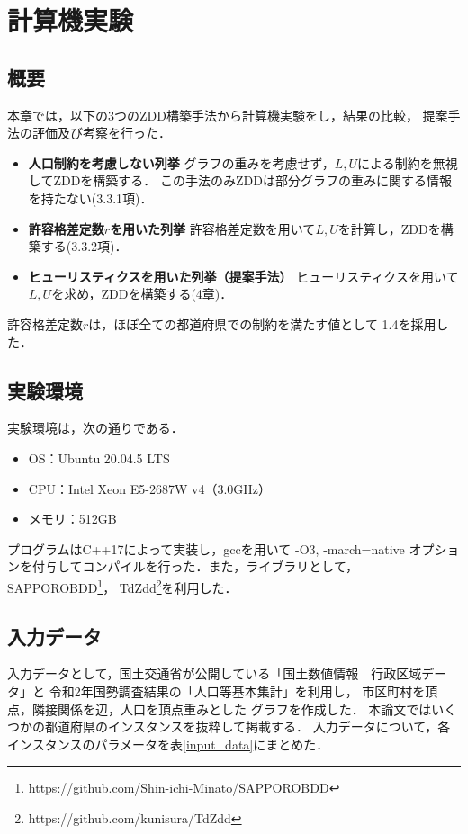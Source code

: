 \chapter{計算機実験} \label{chapter:5}

\section{概要}
本章では，以下の3つのZDD構築手法から計算機実験をし，結果の比較，
提案手法の評価及び考察を行った．

\begin{itemize}
  \item \textbf{人口制約を考慮しない列挙} グラフの重みを考慮せず，$L, U$による制約を無視してZDDを構築する．
  この手法のみZDDは部分グラフの重みに関する情報を持たない(3.3.1項)．
  \item \textbf{許容格差定数$r$を用いた列挙} 許容格差定数を用いて$L, U$を計算し，ZDDを構築する(3.3.2項)．
  \item \textbf{ヒューリスティクスを用いた列挙（提案手法）} ヒューリスティクスを用いて$L, U$を求め，ZDDを構築する(4章)．
\end{itemize}

許容格差定数$r$は，ほぼ全ての都道府県での制約を満たす値として
1.4を採用した．

\section{実験環境}
実験環境は，次の通りである．

\begin{itemize}
  \item OS：Ubuntu 20.04.5 LTS
  \item CPU：Intel Xeon E5-2687W v4（3.0GHz）
  \item メモリ：512GB
\end{itemize}

プログラムはC++17によって実装し，gccを用いて -O3, -march=native
オプションを付与してコンパイルを行った．また，ライブラリとして，
SAPPOROBDD\footnote{\scriptsize{https://github.com/Shin-ichi-Minato/SAPPOROBDD}}，
TdZdd\footnote{\scriptsize{https://github.com/kunisura/TdZdd}}を利用した．

\section{入力データ}
入力データとして，国土交通省が公開している「国土数値情報　行政区域データ」と
令和2年国勢調査結果の「人口等基本集計」を利用し，
市区町村を頂点，隣接関係を辺，人口を頂点重みとした
グラフを作成した．
本論文ではいくつかの都道府県のインスタンスを抜粋して掲載する．
入力データについて，各インスタンスのパラメータを表\ref{input_data}にまとめた．

